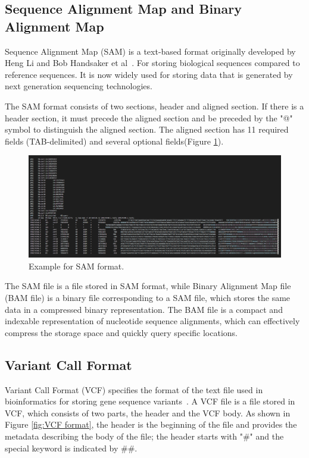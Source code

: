 \documentclass[PhD]{PHlab-thesis}
\begin{document}
\subsection{Sequence Alignment Map and Binary Alignment Map}
Sequence Alignment Map (SAM) is a text-based format originally developed by Heng Li and Bob Handsaker et al~\cite{li2009SAMtools}. For storing biological sequences compared to reference sequences. It is now widely used for storing data that is generated by next generation sequencing technologies.

The SAM format consists of two sections, header and aligned section. If there is a header section, it must precede the aligned section and be preceded by the "@" symbol to distinguish the aligned section. The aligned section has 11 required fields (TAB-delimited) and several optional fields(Figure \ref{fig:SAM format}).

\begin{figure}[h!]
	\centering
	\includegraphics[scale=0.3]{figures/Example for SAM file.png}
	\caption{Example for SAM format.}
	\label{fig:SAM format} %
\end{figure}

The SAM file is a file stored in SAM format, while Binary Alignment Map file (BAM file) is a binary file corresponding to a SAM file, which stores the same data in a compressed binary representation. The BAM file is a compact and indexable representation of nucleotide sequence alignments, which can effectively compress the storage space and quickly query specific locations.

\subsection{Variant Call Format}
Variant Call Format (VCF) specifies the format of the text file used in bioinformatics for storing gene sequence variants~\cite{Danecek2011VCF}. A VCF file is a file stored in VCF, which consists of two parts, the header and the VCF body. As shown in Figure \ref{fig:VCF format}, the header is the beginning of the file and provides the metadata describing the body of the file; the header starts with "\#" and the special keyword is indicated by \#\#.
\end{document}

